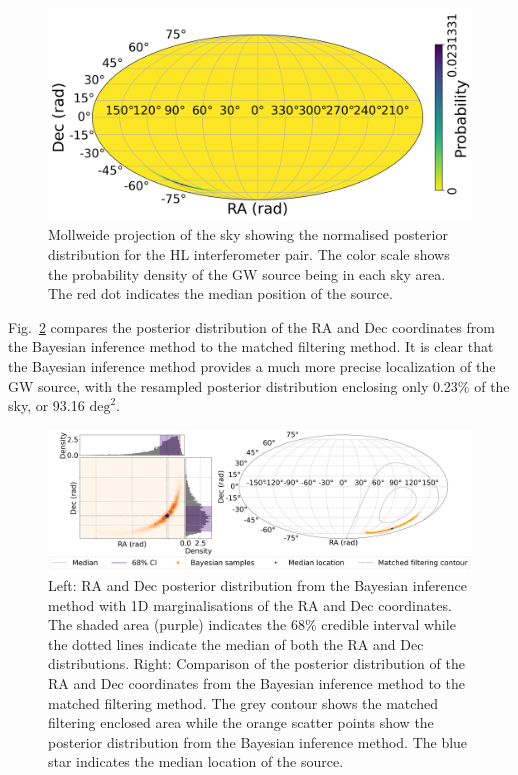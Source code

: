 \documentclass[11pt,a4paper]{article}
\begin{document}
\begin{figure}
    \includegraphics[width=\columnwidth, keepaspectratio]{../figures/posterior_map_HL.png}
    \caption{Mollweide projection of the sky showing the normalised posterior distribution for the HL interferometer pair. The color scale shows the probability density of the GW source being in each sky area. The red dot indicates the median position of the source.}
    \label{fig:sky_hl}
\end{figure}

Fig.~\ref{fig:hl_compare} compares the posterior distribution of the RA and Dec coordinates from the Bayesian inference method to the matched filtering method. It is clear that the Bayesian inference method provides a much more precise localization of the GW source, with the resampled posterior distribution enclosing only 0.23\% of the sky, or 93.16 $\mathrm{deg}^2$.

\begin{landscape}
\begin{figure}
    \includegraphics[width=\columnwidth, keepaspectratio]{../figures/radec_posterior_HL.png}
    \caption{Left: RA and Dec posterior distribution from the Bayesian inference method with 1D marginalisations of the RA and Dec coordinates. The shaded area (purple) indicates the 68\% credible interval while the dotted lines indicate the median of both the RA and Dec distributions. Right: Comparison of the posterior distribution of the RA and Dec coordinates from the Bayesian inference method to the matched filtering method. The grey contour shows the matched filtering enclosed area while the orange scatter points show the posterior distribution from the Bayesian inference method. The blue star indicates the median location of the source.}
    \label{fig:hl_compare}
\end{figure}
\end{landscape}
\end{document}
